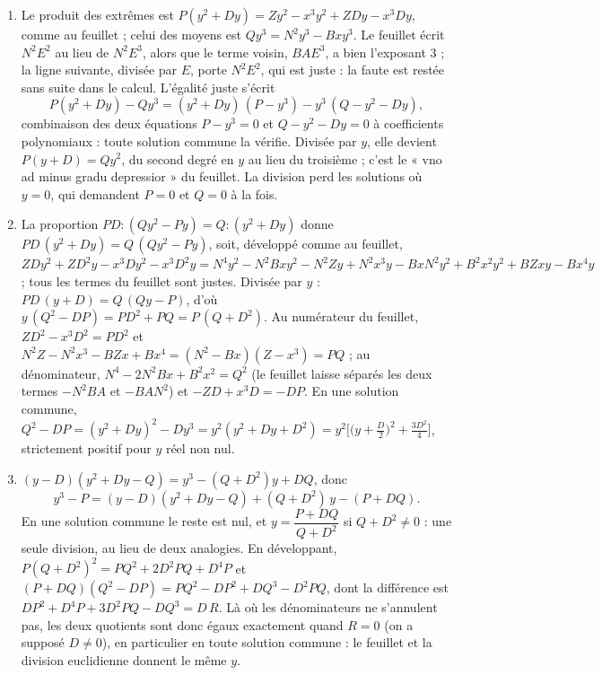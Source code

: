 \documentclass[11pt,a4paper]{article}
\begin{document}
\begin{solution}
\begin{enumerate}
\item Le produit des extrêmes est $P(y^2 + Dy) = Zy^2 - x^3y^2 + ZDy - x^3Dy$,
  comme au feuillet ; celui des moyens est $Qy^3 = N^2y^3 - Bxy^3$. Le feuillet
  écrit $N^2E^2$ au lieu de $N^2E^3$, alors que le terme voisin, $BAE^3$, a bien
  l'exposant 3 ; la ligne suivante, divisée par $E$, porte $N^2E^2$, qui est
  juste : la faute est restée sans suite dans le calcul. L'égalité juste s'écrit
  \[ P(y^2 + Dy) - Qy^3 = (y^2 + Dy)\,(P - y^3) - y^3\,(Q - y^2 - Dy) , \]
  combinaison des deux équations $P - y^3 = 0$ et $Q - y^2 - Dy = 0$ à
  coefficients polynomiaux : toute solution commune la vérifie. Divisée par $y$,
  elle devient $P(y + D) = Qy^2$, du second degré en $y$ au lieu du troisième ;
  c'est le « vno ad minus gradu depressior » du feuillet. La division perd les
  solutions où $y = 0$, qui demandent $P = 0$ et $Q = 0$ à la fois.
\item La proportion $PD : (Qy^2 - Py) = Q : (y^2 + Dy)$ donne
  $PD\,(y^2 + Dy) = Q\,(Qy^2 - Py)$, soit, développé comme au feuillet,
  $ZDy^2 + ZD^2y - x^3Dy^2 - x^3D^2y = N^4y^2 - N^2Bxy^2 - N^2Zy + N^2x^3y
  - BxN^2y^2 + B^2x^2y^2 + BZxy - Bx^4y$ ; tous les termes du feuillet sont
  justes. Divisée par $y$ : $PD\,(y + D) = Q\,(Qy - P)$, d'où
  $y\,(Q^2 - DP) = PD^2 + PQ = P\,(Q + D^2)$. Au numérateur du feuillet,
  $ZD^2 - x^3D^2 = PD^2$ et $N^2Z - N^2x^3 - BZx + Bx^4 = (N^2 - Bx)(Z - x^3)
  = PQ$ ; au dénominateur, $N^4 - 2N^2Bx + B^2x^2 = Q^2$ (le feuillet laisse
  séparés les deux termes $-N^2BA$ et $-BAN^2$) et $-ZD + x^3D = -DP$. En une
  solution commune,
  $Q^2 - DP = (y^2 + Dy)^2 - Dy^3 = y^2(y^2 + Dy + D^2)
  = y^2\bigl[\bigl(y + \frac D2\bigr)^2 + \frac{3D^2}{4}\bigr]$, strictement
  positif pour $y$ réel non nul.
\item $(y - D)(y^2 + Dy - Q) = y^3 - (Q + D^2)y + DQ$, donc
  \[ y^3 - P = (y - D)(y^2 + Dy - Q) + (Q + D^2)\,y - (P + DQ) . \]
  En une solution commune le reste est nul, et $y = \dfrac{P + DQ}{Q + D^2}$ si
  $Q + D^2 \neq 0$ : une seule division, au lieu de deux analogies. En
  développant, $P(Q + D^2)^2 = PQ^2 + 2D^2PQ + D^4P$ et
  $(P + DQ)(Q^2 - DP) = PQ^2 - DP^2 + DQ^3 - D^2PQ$, dont la différence est
  $DP^2 + D^4P + 3D^2PQ - DQ^3 = D\,R$. Là où les dénominateurs ne s'annulent pas, les deux quotients sont donc
  égaux exactement quand $R = 0$ (on a supposé $D \neq 0$), en particulier en toute
  solution commune : le feuillet et la division euclidienne donnent le même $y$.

\end{enumerate}
\end{solution}
\end{document}
